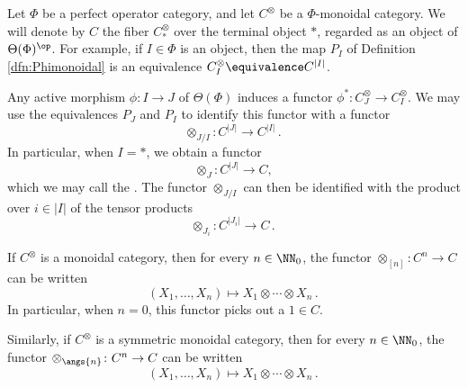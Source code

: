 \begin{notation}
	Let $ \Phi $ be a perfect operator category,
	and let $ C^{\otimes} $ be a $ \Phi $-monoidal category.
	We will denote by $ C $ the fiber $ C^{\otimes}_{\ast} $
	over the terminal object $ \ast $,
	regarded as an object of $ \Theta(\Phi)^{\op} $.
	For example, if $ I \in \Phi $ is an object, then 
	the map $ P_I $ of Definition \ref{dfn:Phimonoidal} is
	an equivalence $ C^{\otimes}_I \equivalence C^{|I|} $.
	
	Any active morphism
	$ \phi \colon I \to J $ of $ \Theta(\Phi) $
	induces a functor
	$ \phi^{\ast} \colon C^{\otimes}_J \to C^{\otimes}_I $.
	We may use the equivalences $ P_J $ and $ P_I $ 
	to identify this functor with a functor
	\[
		\otimes_{J/I} \colon C^{|J|} \to C^{|I|} \period
	\]
	In particular, when $ I = \ast $, we obtain a functor
	\[
		\otimes_{J} \colon C^{|J|} \to C \comma
	\]
	which we may call the .
	The functor $ \otimes_{J/I} $ can then be identified
	with the product over $ i \in |I| $ of
	the tensor products
	\[
		\otimes_{J_i} \colon C^{|J_i|} \to C \period
	\]
\end{notation}

\begin{eg}
	If $ C^{\otimes} $ is a monoidal category,
	then for every $ n \in \NN_0 $,
	the functor $ \otimes_{[n]} \colon C^n \to C $
	can be written
	\[
		(X_1, \dots, X_n) \mapsto
		X_1 \otimes \cdots \otimes X_n \period
	\]
	In particular, when $ n = 0 $,
	this functor picks out a 
	$ 1 \in C $. 
\end{eg}

\begin{eg}
	Similarly, if $ C^{\otimes} $ is a symmetric monoidal category,
	then for every $ n \in \NN_0 $,
	the functor $ \otimes_{\angs{n}} \colon C^n \to C $
	can be written
	\[
		(X_1, \dots, X_n) \mapsto
		X_1 \otimes \cdots \otimes X_n \period
	\]
\end{eg}


